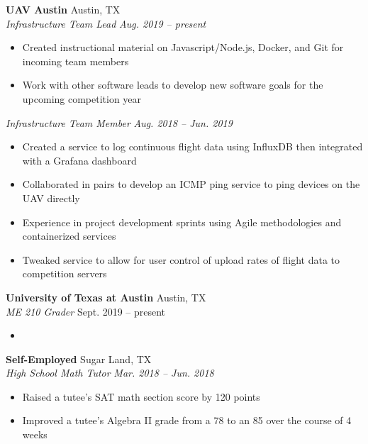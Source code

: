 \documentclass[letterpaper,11pt]{article}
\begin{document}
\textbf{UAV Austin} \hfill Austin, TX\\
\textit{Infrastructure Team Lead} \hfill \textit{Aug. 2019 -- present}\\
\begin{itemize}[noitemsep, topsep=0pt, leftmargin=0.7cm]
  \item Created instructional material on Javascript/Node.js, Docker, and Git for incoming team members
  \item Work with other software leads to develop new software goals for the upcoming competition year
\end{itemize}

\textit{Infrastructure Team Member} \hfill \textit{Aug. 2018 -- Jun. 2019}\\
\begin{itemize}[noitemsep, topsep=0pt, leftmargin=0.7cm]
  \item Created a service to log continuous flight data using InfluxDB then integrated with a Grafana dashboard
  \item Collaborated in pairs to develop an ICMP ping service to ping devices on the UAV directly
  \item Experience in project development sprints using Agile methodologies and containerized services 
  \item Tweaked service to allow for user control of upload rates of flight data to competition servers %
\end{itemize}

\textbf{University of Texas at Austin} \hfill Austin, TX\\
\textit{ME 210 Grader} \hfill Sept. 2019 -- present\\
\begin{itemize}[noitemsep, topsep=0pt, leftmargin=0.7cm]
  \item %
\end{itemize}
\textbf{Self-Employed} \hfill Sugar Land, TX\\
\textit{High School Math Tutor} \hfill \textit{Mar. 2018 -- Jun. 2018}\\
\begin{itemize}[noitemsep, topsep=0pt, leftmargin=0.7cm]
  \item Raised a tutee’s SAT math section score by 120 points
  \item Improved a tutee’s Algebra II grade from a 78 to an 85 over the course of 4 weeks
\end{itemize}
\end{document}
